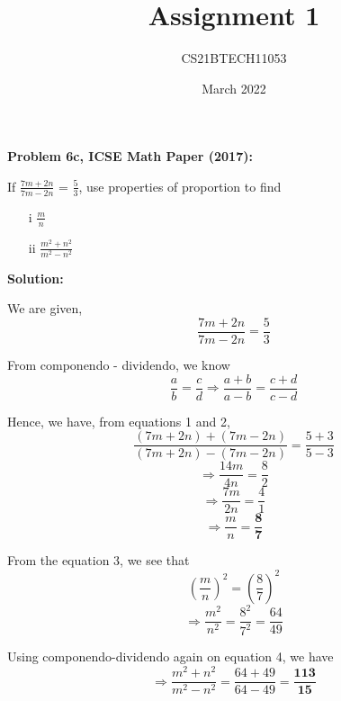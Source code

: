 \documentclass[journal, 12pt, twocolumn]{IEEEtran}
\begin{document}
\title{Assignment 1}
\author{CS21BTECH11053}
\date{March 2022}
\maketitle
 
\textbf{Problem 6c, ICSE Math Paper (2017):}
 
If \(\frac{7m + 2n}{7m - 2n}\) = \(\frac{5}{3}\), use properties of proportion to find
\begin{enumerate}
    \item[i] \(\frac{m}{n}\)
    \item[ii] \(\frac{m^2 + n^2}{m^2 - n^2}\)
\end{enumerate}
\vspace{1cm}
 
\textbf{Solution: }
 
We are given,
\begin{equation}
\frac{7m + 2n}{7m - 2n} = \frac{5}{3}
\end{equation}
 
From componendo - dividendo, we know
\begin{equation}
\frac{a}{b} = \frac{c}{d} \Rightarrow \frac{a+b}{a-b} = \frac{c+d}{c-d}
\end{equation}
 
Hence, we have, from equations 1 and 2,
\begin{equation*}
\frac{(7m + 2n) + (7m - 2n)}{(7m + 2n) - (7m - 2n)} = \frac{5 + 3}{5 - 3}
\end{equation*}
\begin{equation*}
\Rightarrow \frac{14m}{4n} = \frac{8}{2}
\end{equation*}
\begin{equation*}
\Rightarrow \frac{7m}{2n} = \frac{4}{1}
\end{equation*}
\begin{equation}
\Rightarrow \frac{m}{n} = \frac{\textbf{8}}{\textbf{7}}
\end{equation}
 
From the equation 3, we see that
\begin{equation*}
\left(\frac{m}{n}\right)^2 = \left(\frac{8}{7}\right)^2
\end{equation*}
\begin{equation}
\Rightarrow \frac{m^2}{n^2} = \frac{8^2}{7^2} = \frac{64}{49}
\end{equation}
 
Using componendo-dividendo again on equation 4, we have
\begin{equation}
\Rightarrow \frac{m^2 + n^2}{m^2 - n^2} = \frac{64 + 49}{64 - 49} = \frac{\textbf{113}}{\textbf{15}}
\end{equation}
 
\end{document}
